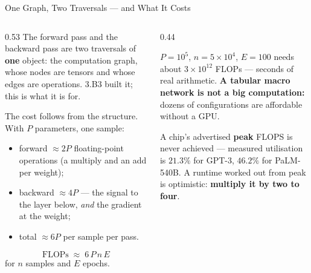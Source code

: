 \begin{frame}{One Graph, Two Traversals --- and What It Costs}
\begin{columns}[T]
\begin{column}{0.53\textwidth}
\small
The forward pass and the backward pass are two traversals of \textbf{one} object: the computation graph, whose nodes are tensors and whose edges are operations. 3.B3 built it; this is what it is for.
\medskip

The cost follows from the structure. With $P$ parameters, one sample:
\begin{itemize}\small\setlength{\itemsep}{1mm}
  \item forward $\approx 2P$ floating-point operations (a multiply and an add per weight);
  \item backward $\approx 4P$ --- the signal to the layer below, \emph{and} the gradient at the weight;
  \item total $\approx 6P$ per sample per pass.
\end{itemize}
\[
  \text{FLOPs}\;\approx\;6\,P\,n\,E
\]
for $n$ samples and $E$ epochs.
\end{column}
\begin{column}{0.44\textwidth}
\begin{takeawaybox}[title=\textbf{Use it as a budget}]\small
$P=10^{5}$, $n=5\times10^{4}$, $E=100$ needs about $3\times10^{12}$ FLOPs --- seconds of real arithmetic. \textbf{A tabular macro network is not a big computation:} dozens of configurations are affordable without a GPU.
\end{takeawaybox}
\smallskip
{\footnotesize A chip's advertised \textbf{peak} FLOPS is never achieved --- measured utilisation is $21.3\%$ for GPT-3, $46.2\%$ for PaLM-540B. A runtime worked out from peak is optimistic: \textbf{multiply it by two to four}.}
\end{column}
\end{columns}
\vspace{1mm}
\end{frame}

